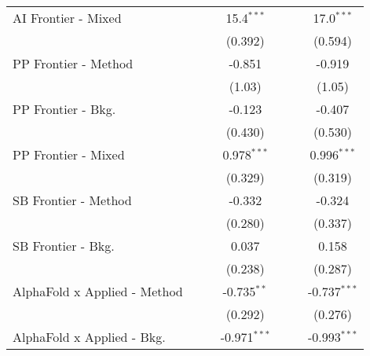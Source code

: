 \begin{tabular}{lcccccc}
   AI Frontier - Mixed            &                &                & 15.4$^{***}$   &                &                & 17.0$^{***}$\\   
                                  &                &                & (0.392)        &                &                & (0.594)\\   
   PP Frontier - Method           &                &                & -0.851         &                &                & -0.919\\   
                                  &                &                & (1.03)         &                &                & (1.05)\\   
   PP Frontier - Bkg.             &                &                & -0.123         &                &                & -0.407\\   
                                  &                &                & (0.430)        &                &                & (0.530)\\   
   PP Frontier - Mixed            &                &                & 0.978$^{***}$  &                &                & 0.996$^{***}$\\   
                                  &                &                & (0.329)        &                &                & (0.319)\\   
   SB Frontier - Method           &                &                & -0.332         &                &                & -0.324\\   
                                  &                &                & (0.280)        &                &                & (0.337)\\   
   SB Frontier - Bkg.             &                &                & 0.037          &                &                & 0.158\\   
                                  &                &                & (0.238)        &                &                & (0.287)\\   
   AlphaFold x Applied - Method   &                &                & -0.735$^{**}$  &                &                & -0.737$^{***}$\\   
                                  &                &                & (0.292)        &                &                & (0.276)\\   
   AlphaFold x Applied - Bkg.     &                &                & -0.971$^{***}$ &                &                & -0.993$^{***}$\\   

\end{tabular}
